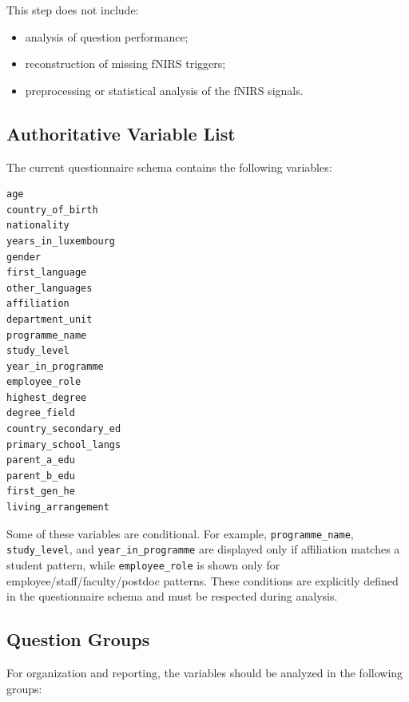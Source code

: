 This step does not include:
\begin{itemize}
    \item analysis of question performance;
    \item reconstruction of missing fNIRS triggers;
    \item preprocessing or statistical analysis of the fNIRS signals.
\end{itemize}

\subsection{Authoritative Variable List}
The current questionnaire schema contains the following variables:
\begin{verbatim}
age
country_of_birth
nationality
years_in_luxembourg
gender
first_language
other_languages
affiliation
department_unit
programme_name
study_level
year_in_programme
employee_role
highest_degree
degree_field
country_secondary_ed
primary_school_langs
parent_a_edu
parent_b_edu
first_gen_he
living_arrangement
\end{verbatim}

Some of these variables are conditional.
For example, \texttt{programme\_name}, \texttt{study\_level}, and \texttt{year\_in\_programme}
are displayed only if affiliation matches a student pattern, while \texttt{employee\_role} is shown
only for employee/staff/faculty/postdoc patterns. These conditions are explicitly defined in the
questionnaire schema and must be respected during analysis. \cite{step1_demo_schema}

\subsection{Question Groups}
For organization and reporting, the variables should be analyzed in the following groups:

